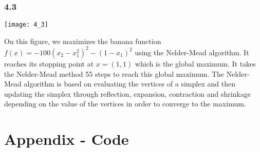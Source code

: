 \documentclass{article}
\begin{document}
\subsubsection*{4.3}

\texttt{[image: 4\_3]}

On this figure, we maximizes the banana function $f(x)=-100(x_2-x_1^2)^2-(1-x_1)^2$ using the Nelder-Mead algorithm. It reaches its stopping point at $x=(1,1)$ which is the global maximum. It takes the Nelder-Mead method 55 steps to reach this global maximum. The Nelder-Mead algorithm is based on evaluating the vertices of a simplex and then updating the simplex through reflection, expansion, contraction and shrinkage depending on the value of the vertices in order to converge to the maximum.
\clearpage

\appendix
\section*{Appendix - Code}


\clearpage


\clearpage


\clearpage
\end{document}
